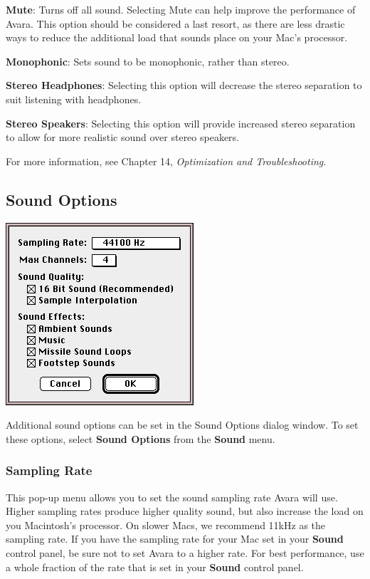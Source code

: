 \documentclass{article}
\begin{document}
\textbf{Mute}: Turns off all sound. Selecting Mute can help improve the performance of Avara. This option should be considered a last resort, as there are less drastic ways to reduce the additional load that sounds place on your Mac's processor.

\textbf{Monophonic}: Sets sound to be monophonic, rather than stereo.

\textbf{Stereo Headphones}: Selecting this option will decrease the stereo separation to suit listening with headphones.

\textbf{Stereo Speakers}: Selecting this option will provide increased stereo separation to allow for more realistic sound over stereo speakers.

For more information, see Chapter 14, \textit{Optimization and Troubleshooting}.

\subsection{Sound Options}
\begin{center}
	\includegraphics{img/09.png}
\end{center}

Additional sound options can be set in the Sound Options dialog window. To set these options, select \textbf{Sound Options} from the \textbf{Sound} menu.

\subsubsection{Sampling Rate}
This pop-up menu allows you to set the sound sampling rate Avara will use. Higher sampling rates produce higher quality sound, but also increase the load on you Macintosh's processor. On slower Macs, we recommend 11kHz as the sampling rate. If you have the sampling rate for your Mac set in your \textbf{Sound} control panel, be sure not to set Avara to a higher rate. For best performance, use a whole fraction of the rate that is set in your \textbf{Sound} control panel.
\end{document}
